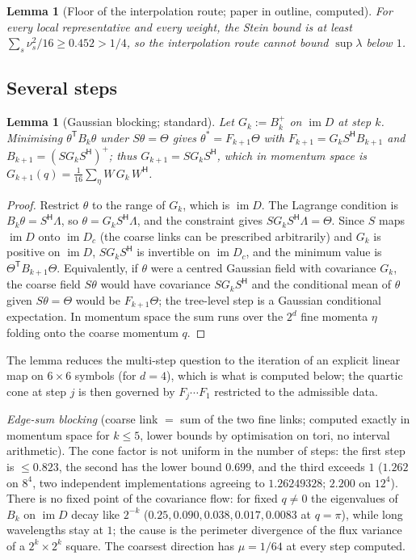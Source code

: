 \documentclass[11pt,a4paper]{article}
\newtheorem{lemma}[theorem]{Lemma}
\theoremstyle{definition}
\theoremstyle{remark}
\newcommand{\im}{\operatorname{im}}
\begin{document}
\begin{lemma}[Floor of the interpolation route; paper in outline, computed]\label{lem:floor}
For every local representative and every weight, the Stein bound is at least $\sum_s\nu_s^2/16\ge0.452>1/4$, so the interpolation route cannot bound $\sup\lambda$ below $1$.
\end{lemma}

\subsection{Several steps}

\begin{lemma}[Gaussian blocking; standard]\label{lem:A}
Let $G_k:=B_k^{+}$ on $\im D$ at step $k$. Minimising $\theta^{\mathsf T}B_k\theta$ under $S\theta=\Theta$ gives $\theta^*=F_{k+1}\Theta$ with $F_{k+1}=G_kS^{\mathsf H}B_{k+1}$ and $B_{k+1}=(SG_kS^{\mathsf H})^{+}$; thus $G_{k+1}=SG_kS^{\mathsf H}$, which in momentum space is $G_{k+1}(q)=\frac1{16}\sum_\eta W\,G_k\,W^{\mathsf H}$.
\end{lemma}

\begin{proof}
Restrict $\theta$ to the range of $G_k$, which is $\im D$. The Lagrange condition is $B_k\theta=S^{\mathsf H}\Lambda$, so $\theta=G_kS^{\mathsf H}\Lambda$, and the constraint gives $SG_kS^{\mathsf H}\Lambda=\Theta$. Since $S$ maps $\im D$ onto $\im D_c$ (the coarse links can be prescribed arbitrarily) and $G_k$ is positive on $\im D$, $SG_kS^{\mathsf H}$ is invertible on $\im D_c$, and the minimum value is $\Theta^{\mathsf T}B_{k+1}\Theta$. Equivalently, if $\theta$ were a centred Gaussian field with covariance $G_k$, the coarse field $S\theta$ would have covariance $SG_kS^{\mathsf H}$ and the conditional mean of $\theta$ given $S\theta=\Theta$ would be $F_{k+1}\Theta$; the tree-level step is a Gaussian conditional expectation. In momentum space the sum runs over the $2^d$ fine momenta $\eta$ folding onto the coarse momentum $q$.
\end{proof}

The lemma reduces the multi-step question to the iteration of an explicit linear map on $6\times6$ symbols (for $d=4$), which is what is computed below; the quartic cone at step $j$ is then governed by $F_j\cdots F_1$ restricted to the admissible data.

\emph{Edge-sum blocking} (coarse link $=$ sum of the two fine links; computed exactly in momentum space for $k\le5$, lower bounds by optimisation on tori, no interval arithmetic). The cone factor is not uniform in the number of steps: the first step is $\le0.823$, the second has the lower bound $0.699$, and the third exceeds $1$ ($1.262$ on $8^4$, two independent implementations agreeing to $1.26249328$; $2.200$ on $12^4$). There is no fixed point of the covariance flow: for fixed $q\ne0$ the eigenvalues of $B_k$ on $\im D$ decay like $2^{-k}$ ($0.25,0.090,0.038,0.017,0.0083$ at $q=\pi$), while long wavelengths stay at $1$; the cause is the perimeter divergence of the flux variance of a $2^k\times2^k$ square. The coarsest direction has $\mu=1/64$ at every step computed.
\end{document}
